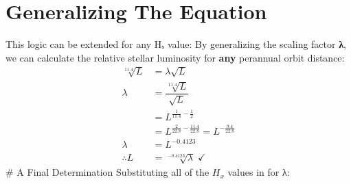 \documentclass[
  letterpaper,
]{book}
\begin{document}
\section{Generalizing The Equation}\label{generalizing-the-equation}

This logic can be extended for any Hₓ value: By generalizing the scaling
factor \textbf{λ}, we can calculate the relative stellar luminosity for
\textbf{any} perannual orbit distance: \[
\begin{align}
\sqrt[11.4]{L} &= \lambda\sqrt{L} \\
\lambda &= \dfrac{\sqrt[11.4]{L}}{\sqrt{L}} \\
&= L^{\frac{1}{11.4} - {\frac{1}{2}}} \\
&= L^{\frac{2}{22.8}-\frac{11.4}{22.8}} = L^{-\frac{9.4}{22.8}} \\
\lambda &= L^{-0.4123} \\
\therefore L &= \sqrt[-0.4123]{\lambda} \; ✓
\end{align}
\] \# A Final Determination Substituting all of the \(H_x\) values in
for λ:
\end{document}
